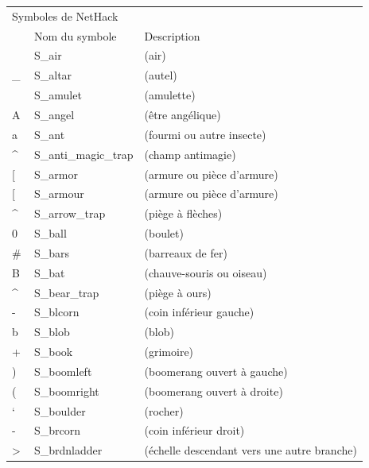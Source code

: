 \documentclass[titlepage]{article}
\begin{document}
\begin{longtable}{lll}
\multicolumn{3}{l}{Symboles de NetHack}\\
~~ & Nom du symbole & Description\\
\hline
~ & S\_air & (air)\\
\_ & S\_altar & (autel)\\
\textquotedbl{} & S\_amulet & (amulette)\\
A & S\_angel & (être angélique)\\
a & S\_ant & (fourmi ou autre insecte)\\
\textasciicircum{} & S\_anti\_magic\_trap & (champ antimagie)\\
{}[ & S\_armor & (armure ou pièce d'armure)\\
{}[ & S\_armour & (armure ou pièce d'armure)\\
\textasciicircum{} & S\_arrow\_trap & (piège à flèches)\\
0 & S\_ball & (boulet)\\
\# & S\_bars & (barreaux de fer)\\
B & S\_bat & (chauve-souris ou oiseau)\\
\textasciicircum{} & S\_bear\_trap & (piège à ours)\\
- & S\_blcorn & (coin inférieur gauche)\\
b & S\_blob & (blob)\\
+ & S\_book & (grimoire)\\
) & S\_boomleft & (boomerang ouvert à gauche)\\
( & S\_boomright & (boomerang ouvert à droite)\\
` & S\_boulder & (rocher)\\
- & S\_brcorn & (coin inférieur droit)\\
\textgreater{} & S\_brdnladder & (échelle descendant vers une autre branche)\\

\end{longtable}
\end{document}
